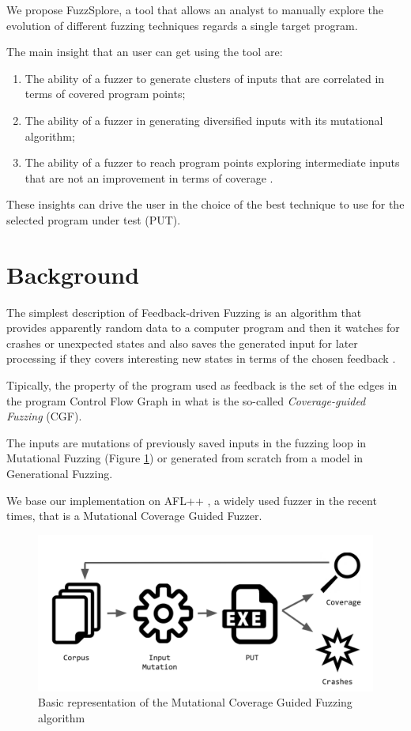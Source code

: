 \documentclass[conference,compsoc]{IEEEtran}
\begin{document}
We propose {\sc FuzzSplore}, a tool that allows an analyst to manually explore the evolution of different fuzzing techniques regards a single target program.

The main insight that an user can get using the tool are:

\begin{enumerate}
\item The ability of a fuzzer to generate clusters of inputs that are correlated in terms of covered program points;
\item The ability of a fuzzer in generating diversified inputs with its mutational algorithm;
\item The ability of a fuzzer to reach program points exploring intermediate inputs that are not an improvement in terms of coverage \cite{besensitive}.
\end{enumerate}

These insights can drive the user in the choice of the best technique to use for the selected program under test (PUT).

\section{Background}
\label{sec:back}

The simplest description of Feedback-driven Fuzzing is an algorithm that provides apparently random data to a computer program and then it watches for crashes or unexpected states and also saves the generated input for later processing if they covers interesting new states in terms of the chosen feedback \cite{fuzzing-book}.

Tipically, the property of the program used as feedback is the set of the edges in the program Control Flow Graph \cite{compilerbook} in what is the so-called {\it Coverage-guided Fuzzing} (CGF).

The inputs are mutations of previously saved inputs in the fuzzing loop in Mutational Fuzzing (Figure \ref{fig:cfg}) or generated from scratch from a model in Generational Fuzzing.

We base our implementation on {\sc AFL++} \cite{aflplusplus}, a widely used fuzzer in the recent times, that is a Mutational Coverage Guided Fuzzer.

\begin{figure}[H]
\includegraphics[scale=0.2]{img/cgf}
\centering
\caption{Basic representation of the Mutational Coverage Guided Fuzzing algorithm}
\label{fig:cfg}
\end{figure}
\end{document}
